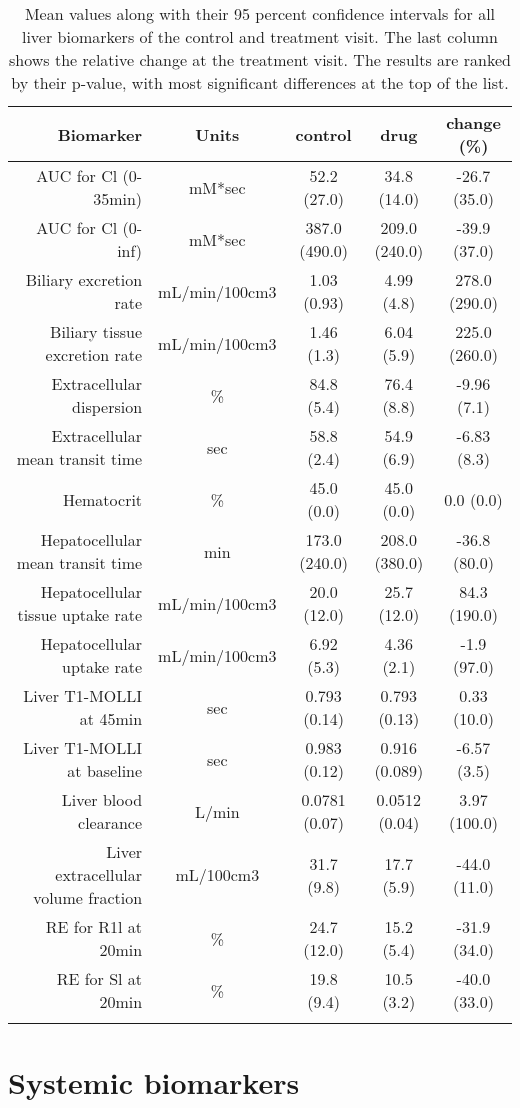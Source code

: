 \documentclass{epflreport}%
\begin{document}
\begin{longtable}{rcccc}%
\hline%
Biomarker&Units&control&drug&change (\%)\\%
\hline%
AUC for Cl (0{-}35min)&mM*sec&52.2 (27.0) &34.8 (14.0) &{-}26.7 (35.0) \\%
AUC for Cl (0{-}inf)&mM*sec&387.0 (490.0) &209.0 (240.0) &{-}39.9 (37.0) \\%
Biliary excretion rate&mL/min/100cm3&1.03 (0.93) &4.99 (4.8) &278.0 (290.0) \\%
Biliary tissue excretion rate&mL/min/100cm3&1.46 (1.3) &6.04 (5.9) &225.0 (260.0) \\%
Extracellular dispersion&\%&84.8 (5.4) &76.4 (8.8) &{-}9.96 (7.1) \\%
Extracellular mean transit time&sec&58.8 (2.4) &54.9 (6.9) &{-}6.83 (8.3) \\%
Hematocrit&\%&45.0 (0.0) &45.0 (0.0) &0.0 (0.0) \\%
Hepatocellular mean transit time&min&173.0 (240.0) &208.0 (380.0) &{-}36.8 (80.0) \\%
Hepatocellular tissue uptake rate&mL/min/100cm3&20.0 (12.0) &25.7 (12.0) &84.3 (190.0) \\%
Hepatocellular uptake rate&mL/min/100cm3&6.92 (5.3) &4.36 (2.1) &{-}1.9 (97.0) \\%
Liver T1{-}MOLLI at 45min&sec&0.793 (0.14) &0.793 (0.13) &0.33 (10.0) \\%
Liver T1{-}MOLLI at baseline&sec&0.983 (0.12) &0.916 (0.089) &{-}6.57 (3.5) \\%
Liver blood clearance&L/min&0.0781 (0.07) &0.0512 (0.04) &3.97 (100.0) \\%
Liver extracellular volume fraction&mL/100cm3&31.7 (9.8) &17.7 (5.9) &{-}44.0 (11.0) \\%
RE for R1l at 20min&\%&24.7 (12.0) &15.2 (5.4) &{-}31.9 (34.0) \\%
RE for Sl at 20min&\%&19.8 (9.4) &10.5 (3.2) &{-}40.0 (33.0) \\%
\hline%
\caption{Mean values along with their 95 percent confidence intervals for all liver biomarkers of the control and treatment visit. The last column shows the relative change at the treatment visit. The results are ranked by their p-value, with most significant differences at the top of the list.} \\%
\end{longtable}%
\clearpage%
\section{Systemic biomarkers}%
\label{sec:Systemicbiomarkers}%
\end{document}
